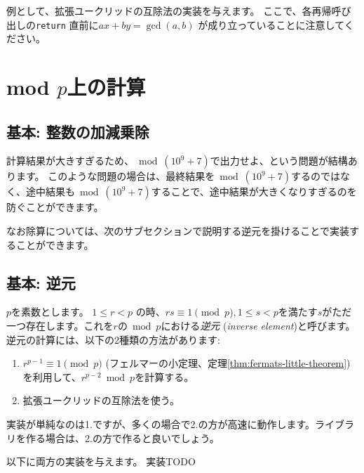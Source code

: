 \documentclass{jsarticle}
\begin{document}
  例として、拡張ユークリッドの互除法の実装を与えます。
  ここで、各再帰呼び出しの\verb+return+ 直前に$ax+by=\gcd(a,b)$ が成り立っていることに注意してください。
  
 \section{mod $p$上の計算}
 \label{sec:mod-p-arithmetic}
  \subsection{基本: 整数の加減乗除}
  計算結果が大きすぎるため、${} \bmod (10^9+7)$で出力せよ、という問題が結構あります。
  このような問題の場合は、最終結果を${} \bmod (10^9+7)$するのではなく、途中結果も${} \bmod (10^9+7)$することで、途中結果が大きくなりすぎるのを防ぐことができます。

  なお除算については、次のサブセクションで説明する逆元を掛けることで実装することができます。
  \subsection{基本: 逆元}
  \label{subsec:inverse-element}
  $p$を素数とします。
  $1 \le r < p$ の時、$rs \equiv 1 \pmod p, 1 \le s < p$を満たす$s$がただ一つ存在します。これを$r$の${} \bmod p$における\emph{逆元} (\emph{inverse element})と呼びます。
  逆元の計算には、以下の2種類の方法があります:
  \begin{enumerate}
   \item $r^{p-1} \equiv 1 \pmod p$ (フェルマーの小定理、定理\ref{thm:fermats-little-theorem})を利用して、$r^{p-2} \bmod p$を計算する。
   \item 拡張ユークリッドの互除法を使う。
  \end{enumerate}
  実装が単純なのは1.ですが、多くの場合で2.の方が高速に動作します。ライブラリを作る場合は、2.の方で作ると良いでしょう。

  以下に両方の実装を与えます。 実装TODO
\end{document}
